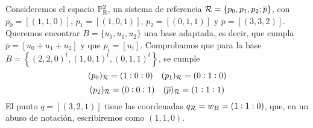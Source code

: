 
\begin{example}
    Consideremos el espacio $\mathbb{P}^2_{\mathbb{R}}$, un sistema de referencia $\mathcal{R} = \{ p_0, p_1, p_2; \overline{p}\}$, con
    $p_0 = [(1, 1, 0)]$, $p_1 = [(1, 0, 1)]$, $p_2 = [(0, 1, 1)]$ y $\overline{p} = [(3,3,2)]$.
    Queremos encontrar $B = \{u_0, u_1, u_2\}$ una base adaptada, es decir, que cumpla $\overline{p} = [u_0+u_1+u_2]$
    y que $p_i = [u_i]$. Comprobamos que para la base $B = \left \{ (2,2,0)^t, (1,0,1)^t, (0,1,1)^t \right \}$, se cumple
    \[(p_0)_{\mathcal{R}} = (1:0:0) \quad (p_1)_{\mathcal{R}} = (0:1:0)\]
    \[(p_2)_{\mathcal{R}} = (0:0:1) \quad (\overline{p})_{\mathcal{R}} = (1:1:1)\]
    El punto $q = [(3, 2, 1)]$ tiene las coordenadas $q_{\mathcal{R}} = w_B = (1:1:0)$, que, en un abuso de notación,
    escribiremos como $(1, 1, 0)$.
\end{example}

